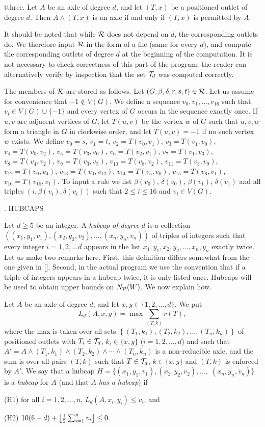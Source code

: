 \thm tthree.  Let $A$ be an axle of degree $d$, and let $(T,x)$ be a positioned 
outlet of
degree $d$.  Then $A\wedge (T,x)$ is an axle if and only if $(T,x)$ is 
permitted by $A$.

It should be noted that while ${\cal R}$ does not depend on $d$, the corresponding 
outlets
do.  We therefore input ${\cal R}$ in the form of a file (same for every 
$d$), and compute
the corresponding outlets of degree $d$ at the beginning of the computation.  
It is not necessary
to check correctness of this part of the program; the reader can alternatively 
verify
by inspection that the set ${\cal T}_d$ was computed correctly.

The members of ${\cal R}$ are stored as follows.
Let $(G,\beta,\delta, r,s,t)\in{\cal R}$. Let us assume for convenience
that $-1\not\in V(G)$.
 We define a sequence $v_0,v_1,\dots, 
v_{16}$ such that $v_i\in V(G)\cup\{-1\}$ and every vertex of $G$
occurs in the sequence exactly once. If $u,v$
are  adjacent vertices
of $G$, let $T (u,v)$ be the vertex $w$ of $G$ such that $u,v,w$ form 
a triangle
in $G$ in clockwise order, and let $T(u,v)=-1$ if no such
vertex $w$ exists.  We define $v_0=s$, $v_1=t$, $v_2=T(v_0,v_1)$, $v_3=T(v_1,v_0)$,
$v_4=T(v_0,v_2)$, $v_5=T(v_3, v_0)$, $v_6=T(v_2,v_1)$, $v_7=T(v_1,v_3)$, 
$v_8=T(v_4,v_2)$, $v_9=T(v_3,v_5)$, $v_{10}=T(v_8,v_2)$, $v_{11}=T(v_3,v_9)$, 
$v_{12}=T(v_0,v_4)$, $v_{13}=T(v_0,v_{12})$, 
$v_{14}=T(v_5,v_0)$, $v_{15}=T(v_6,v_1)$, 
$v_{16}=T(v_{15},v_1)$. 
To input a rule we list $\beta (v_0)$, $\delta (v_0)$, $\beta (v_1)$, 
$\delta (v_1)$
and all triples $(i,\beta (v_i), \delta (v_i))$ such that 
$2\le i\le16$ and $v_i\in V(G)$.

.  HUBCAPS

Let $d\ge 5$ be an integer.  A {\it hubcap of degree} $d$ is a collection
$((x_1,y_1,v_1),(x_2,y_2,v_2),\allowbreak
\dots,\allowbreak(x_n,y_n,v_n))$ 
of triples of integers such that 
every integer $i=1,2,\dots d$ appears in the list
$x_1,y_1,x_2,y_2,\ldots,x_n,y_n$ exactly twice.
 Let us make two remarks here. First, this definition differs somewhat 
from the one given in []. Second, in the actual program we use
the convention that if a triple of integers appears in a hubcap twice,
it is only listed once.
Hubcaps will be used to obtain upper bounds on $N_{\cal P}(W)$.  We now
explain  how.

Let $A$ be an axle of degree $d$, and let $x,y\in\{1,2,\dots, d\}$.  We 
put
$$L_d(A,x,y)=\max\sum_{(T,k)} r(T),$$
where the max is taken over all sets $\left\{(T_1,k_1), (T_2,k_2),\dots, 
(T_n,k_n)\right\}$
of positioned outlets with $T_i\in{\cal T}_d$, $k_i\in \{x,y\}$ ($i=1,2,\dots, 
d$)
and such that $A'=A\wedge (T_1,k_1)\wedge (T_2,k_2)\wedge\cdots\wedge
(T_n,k_n)$ is a non-reducible axle, and the sum is over all pairs
$(T,k)$ such that $T\in{\cal T}_d$, $k\in \{x,y\}$ and $(T,k)$ is enforced
by $A'$.  We say that  a hubcap
$H=\{(x_1,y_1,v_1),(x_2,y_2,v_2),\dots,$ $(x_n,y_n,v_n)\}$ is a {\it
hubcap} for $A$ (and that $A$ {\it has a hubcap}) if
\item{(H1)} for all $i=1,2,\dots, n$, $L_d (A,x_i,y_i)\le v_i$, and
\item{(H2)} $10(6-d)+\left\lfloor {1\over 2}\sum^n_{i=1}
v_i\right\rfloor\le  0$.

